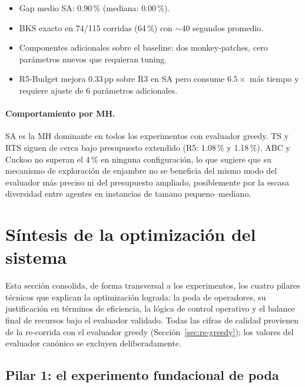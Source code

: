 \documentclass[11pt,a4paper]{article}
\theoremstyle{definition}
\theoremstyle{remark}
\begin{document}
\begin{itemize}
\item Gap medio SA: 0.90\,\% (mediana: 0.00\,\%).
\item BKS exacto en 74/115 corridas (64\,\%) con $\sim 40$ segundos promedio.
\item Componentes adicionales sobre el baseline: dos monkey-patches,
      cero parámetros nuevos que requieran tuning.
\item R5-Budget mejora 0.33\,pp sobre R3 en SA pero consume $6.5\times$
      más tiempo y requiere ajuste de 6 parámetros adicionales.
\end{itemize}

\paragraph{Comportamiento por MH.}
SA es la MH dominante en todos los experimentos con evaluador greedy.
TS y RTS siguen de cerca bajo presupuesto extendido (R5: 1.08\,\% y
1.18\,\%). ABC y Cuckoo no superan el 4\,\% en ninguna configuración,
lo que sugiere que su mecanismo de exploración de enjambre no se
beneficia del mismo modo del evaluador más preciso ni del presupuesto
ampliado, posiblemente por la escasa diversidad entre agentes en
instancias de tamano pequeno--mediano.

\section{Síntesis de la optimización del sistema}
\label{sec:sintesis-optimizacion}

Esta sección consolida, de forma transversal a los experimentos, los
cuatro pilares técnicos que explican la optimización lograda: la poda de
operadores, su justificación en términos de eficiencia, la lógica de
control operativo y el balance final de recursos bajo el evaluador
validado. Todas las cifras de calidad provienen de la re-corrida con el
evaluador greedy (Sección~\ref{sec:re-greedy}); los valores del evaluador
canónico se excluyen deliberadamente.

\subsection{Pilar 1: el experimento fundacional de poda}
\label{subsec:pilar-poda}
\end{document}
